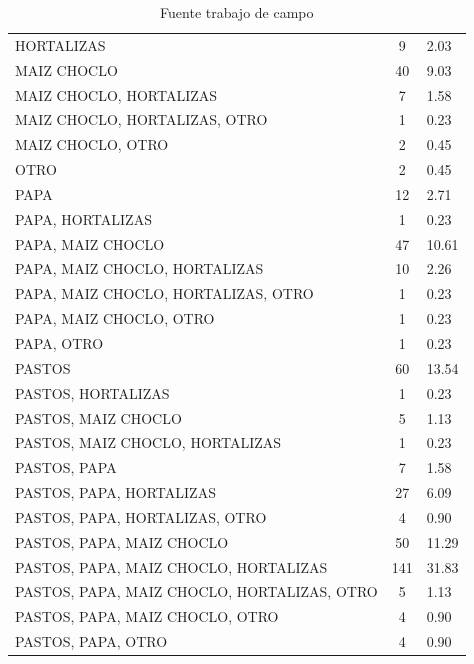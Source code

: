 \documentclass{article}\usepackage[]{graphicx}\usepackage[table]{xcolor}
\newenvironment{tablas}[2]
{\begin{table}[H]
		\centering
		\caption{#1}
		#2
		\caption*{Fuente trabajo de campo}}
	{\end{table}}
\newenvironment{graficas}[2]
{\begin{figure}[H]
		\centering
		\caption{#1}
		#2
		\caption*{Fuente trabajo de campo}}
{\end{figure}}
\begin{document}
\begin{tablas}
{Produccion predominante}{

\begin{tabular}{lcl}
\toprule
\cellcolor[HTML]{87A96B}{\textcolor{black}{\textbf{Cultivo}}} & \cellcolor[HTML]{87A96B}{\textcolor{black}{\textbf{Conteo}}} & \cellcolor[HTML]{87A96B}{\textcolor{black}{\textbf{Porcentaje}}}\\
\midrule
HORTALIZAS & 9 & 2.03\\
MAIZ CHOCLO & 40 & 9.03\\
MAIZ CHOCLO, HORTALIZAS & 7 & 1.58\\
MAIZ CHOCLO, HORTALIZAS, OTRO & 1 & 0.23\\
MAIZ CHOCLO, OTRO & 2 & 0.45\\
\addlinespace
OTRO & 2 & 0.45\\
PAPA & 12 & 2.71\\
PAPA, HORTALIZAS & 1 & 0.23\\
PAPA, MAIZ CHOCLO & 47 & 10.61\\
PAPA, MAIZ CHOCLO, HORTALIZAS & 10 & 2.26\\
\addlinespace
PAPA, MAIZ CHOCLO, HORTALIZAS, OTRO & 1 & 0.23\\
PAPA, MAIZ CHOCLO, OTRO & 1 & 0.23\\
PAPA, OTRO & 1 & 0.23\\
PASTOS & 60 & 13.54\\
PASTOS, HORTALIZAS & 1 & 0.23\\
\addlinespace
PASTOS, MAIZ CHOCLO & 5 & 1.13\\
PASTOS, MAIZ CHOCLO, HORTALIZAS & 1 & 0.23\\
PASTOS, PAPA & 7 & 1.58\\
PASTOS, PAPA, HORTALIZAS & 27 & 6.09\\
PASTOS, PAPA, HORTALIZAS, OTRO & 4 & 0.90\\
\addlinespace
PASTOS, PAPA, MAIZ CHOCLO & 50 & 11.29\\
PASTOS, PAPA, MAIZ CHOCLO, HORTALIZAS & 141 & 31.83\\
PASTOS, PAPA, MAIZ CHOCLO, HORTALIZAS, OTRO & 5 & 1.13\\
PASTOS, PAPA, MAIZ CHOCLO, OTRO & 4 & 0.90\\
PASTOS, PAPA, OTRO & 4 & 0.90\\
\bottomrule
\end{tabular}


}
\end{tablas}
\end{document}
